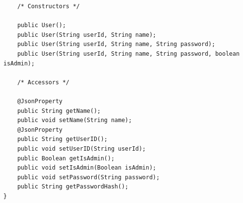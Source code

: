 \begin{small}
\begin{verbatim}
    /* Constructors */
    
    public User();
    public User(String userId, String name);
    public User(String userId, String name, String password);
    public User(String userId, String name, String password, boolean isAdmin);
    
    /* Accessors */
    
    @JsonProperty
    public String getName();
    public void setName(String name);
    @JsonProperty
    public String getUserID();
    public void setUserID(String userId);
    public Boolean getIsAdmin();
    public void setIsAdmin(Boolean isAdmin);
    public void setPassword(String password);
    public String getPasswordHash();
}
\end{verbatim}\end{small}

\clearpage
